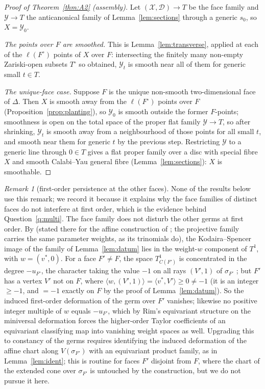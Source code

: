 \documentclass[11pt]{amsart}
\theoremstyle{definition}
\theoremstyle{remark}
\newtheorem{remark}[theorem]{Remark}
\begin{document}
\begin{proof}[Proof of Theorem~\textup{\ref{thm:A2}} (assembly)]
Let $(\mathcal{X}, \mathcal{D}) \to T$ be the face family and
$\mathcal{Y} \to T$ the anticanonical family of
Lemma~\ref{lem:sections} through a generic $s_0$, so
$X = \mathcal{Y}_0$.

\emph{The points over $F$ are smoothed.}  This is
Lemma~\ref{lem:transverse}, applied at each of the $\ell(F^\circ)$ points
of $X$ over $F$: intersecting the finitely many non-empty Zariski-open
subsets $T^\circ$ so obtained, $\mathcal{Y}_t$ is smooth near all of them
for generic small $t \in T$.

\emph{The unique-face case.}  Suppose $F$ is the unique non-smooth
two-dimensional face of $\Delta$.  Then $X$ is smooth away from the
$\ell(F^\circ)$ points over $F$ (Proposition~\ref{prop:planting}), so
$\mathcal{Y}_0$ is smooth outside the former $F$-points; smoothness is
open on the total space of the proper flat family $\mathcal{Y}\to T$, so
after shrinking, $\mathcal{Y}_t$ is smooth away from a neighbourhood of
those points for all small $t$, and smooth near them for generic $t$ by
the previous step.  Restricting $\mathcal{Y}$ to a generic line through
$0 \in T$ gives a flat proper family over a disc with special fibre $X$
and smooth Calabi--Yau general fibre (Lemma~\ref{lem:sections}): $X$ is
smoothable.
\end{proof}

\begin{remark}[first-order persistence at the other faces]
\label{rem:persist}
None of the results below use this remark; we record it because it
explains why the face families of distinct faces do not interfere at
first order, which is the evidence behind Question~\ref{q:multi}.  The
face family does not disturb the other germs at first order.  By
\cite[Rem.~3.7]{Petracci18} (stated there for the affine construction
of \cite[Thm.~3.5]{Petracci18}; the projective family carries the same
parameter weights, as its trinomials do), the Kodaira--Spencer image of
the family of
Lemma~\ref{lem:datum} lies in the weight-$w$ component of $T^1$, with
$w = (v^\ast,0)$.  For a face $F' \neq F$, the space $T^1_{C(F')}$ is
concentrated in the degree $-u_{F'}$, the character taking the value
$-1$ on all rays $(V',1)$ of $\sigma_{F'}$ \cite{Altmann95}; but $F'$
has a vertex $V'$ not on $F$, where
$\langle w, (V',1)\rangle = \langle v^\ast, V'\rangle \ge 0 \neq -1$
(it is an integer $\ge -1$, and $= -1$ exactly on $F$ by the proof of
Lemma~\ref{lem:datum}).  So the induced first-order deformation of the
germ over $F'$ vanishes; likewise no positive integer multiple of $w$
equals $-u_{F'}$, which by Rim's equivariant structure on the miniversal
deformation \cite{Rim} forces the higher-order Taylor coefficients of an
equivariant classifying map into vanishing weight spaces as well.
Upgrading this to constancy of the germs requires identifying the
induced deformation of the affine chart along $V(\sigma_{F'})$ with an
equivariant product family, as in Lemma~\ref{lem:ident}; this is
routine for
faces $F'$ disjoint from $F$, where the chart of the extended cone over
$\sigma_{F'}$ is untouched by the construction, but we do not pursue it
here.
\end{remark}
\end{document}
